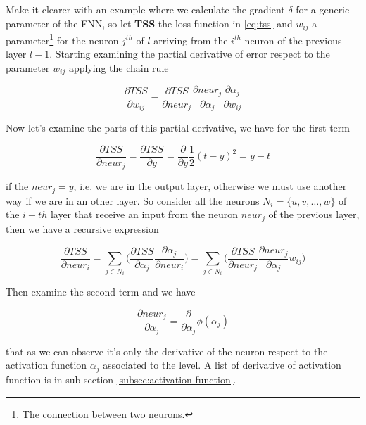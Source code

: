Make it clearer with an example where we calculate the gradient $\delta$ for a generic parameter of the FNN, so let \textbf{TSS} the loss function in \ref{eq:tss} and $w_{ij}$ a parameter\footnote{The connection between two neurons.} for the neuron $j^{th}$ of $l$ arriving from the $i^{th}$ neuron of the previous layer $l-1$. Starting examining the partial derivative of error respect to the parameter $w_{ij}$ applying the chain rule
\begin{center}
	\begin{equation}
	\frac{\partial{TSS}}{\partial{w_{ij}}} = \frac{\partial{TSS}}{\partial{neur_j}}\frac{\partial{neur_j}}{\partial{\alpha_j}}\frac{\partial{\alpha_j}}{\partial{w_{ij}}}
	\end{equation}\label{eq:partial-derivative-w_ij}
\end{center}

Now let's examine the parts of this partial derivative, we have for the first term
\begin{center}
	\begin{equation}
		\frac{\partial{TSS}}{\partial{neur_j}} = \frac{\partial{TSS}}{\partial{y}} = \frac{\partial{}}{\partial{y}}\frac{1}{2}(t - y)^2 = y - t
	\end{equation}\label{eq:partial-derivative-output-layer}
\end{center}
if the $neur_j = y$, i.e. we are in the output layer, otherwise we must use another way if we are in an other layer. So consider all the neurons $N_i = \{u, v, \dots, w\}$ of the $i-th$ layer that receive an input from the neuron $neur_j$ of the previous layer, then we have a recursive expression
\begin{center}
	\begin{equation}
		\frac{\partial{TSS}}{\partial{neur_i}} = \sum\limits_{j \in N_i}\Bigg(\frac{\partial{TSS}}{\partial\alpha_j}\frac{\partial{\alpha_j}}{\partial{neur_i}}\Bigg) = \sum\limits_{j \in N_i}\Bigg(\frac{\partial{TSS}}{\partial{neur_j}}\frac{\partial{neur_j}}{\partial{\alpha_j}}w_{ij}\Bigg)
	\end{equation}\label{eq:partial-derivative-inner-layer}
\end{center}

Then examine the second term and we have
\begin{center}
	\begin{equation}
		\frac{\partial{neur_j}}{\partial{\alpha_j}} = \frac{\partial{}}{\partial{\alpha_j}}\phi(\alpha_j)
	\end{equation}
\end{center}
that as we can observe it's only the derivative of the neuron respect to the activation function $\alpha_j$ associated to the level. A list of derivative of activation function is in sub-section \ref{subsec:activation-function}.

